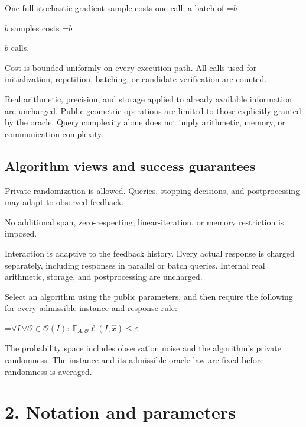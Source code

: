 \documentclass[10pt,a4paper]{article}
\newcommand{\AtlasMath}[1]{\par\begingroup\centering\setbox0=\hbox{$\displaystyle #1$}\ifdim\wd0>1.4\linewidth\typeout{ATLAS WIDE FORMULA: \the\wd0}\fi\ifdim\wd0>\linewidth\resizebox{\linewidth}{!}{\box0}\else\box0\fi\par\endgroup}
\newcommand{\AtlasInlineMath}[1]{\begingroup\setbox0=\hbox{$#1$}\ifdim\wd0>.4\linewidth\endgroup\AtlasMath{#1}\else\endgroup$#1$\fi}
\begin{document}
One full stochastic-gradient sample costs one call; a batch of \AtlasInlineMath{b} samples costs \AtlasInlineMath{b} calls.



Cost is bounded uniformly on every execution path. All calls used for initialization, repetition, batching, or candidate verification are counted.



Real arithmetic, precision, and storage applied to already available information are uncharged. Public geometric operations are limited to those explicitly granted by the oracle. Query complexity alone does not imply arithmetic, memory, or communication complexity.



\subsection{Algorithm views and success guarantees}


Private randomization is allowed. Queries, stopping decisions, and postprocessing may adapt to observed feedback.



No additional span, zero-respecting, linear-iteration, or memory restriction is imposed.



Interaction is adaptive to the feedback history. Every actual response is charged separately, including responses in parallel or batch queries. Internal real arithmetic, storage, and postprocessing are uncharged.



Select an algorithm using the public parameters, and then require the following for every admissible instance and response rule:




\AtlasMath{\forall I\,\forall\mathcal{O}\in\mathcal{O}(I):\ \mathbb{E}_{A,\mathcal{O}}\ell(I,\widehat{x})\le\varepsilon}




The probability space includes observation noise and the algorithm's private randomness. The instance and its admissible oracle law are fixed before randomness is averaged.



\section{2. Notation and parameters}
\end{document}
